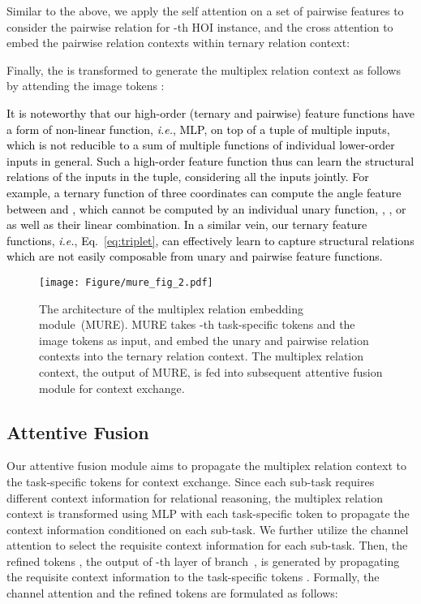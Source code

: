 \documentclass[10pt,twocolumn,letterpaper]{article}
\newcommand{\sh}[1]{\textcolor{black}{#1}}
\begin{document}
Similar to the above,
we apply the self attention on a set of pairwise features to consider the pairwise relation for -th HOI instance, and the cross attention to embed the pairwise relation contexts within ternary relation context:




Finally, the  is transformed to generate the multiplex relation context  as follows by attending the image tokens :


\sh{It is noteworthy that our high-order (ternary and pairwise) feature functions have a form of non-linear function, \textit{i.e.}, MLP, on top of a tuple of multiple inputs, which is not reducible to a sum of multiple functions of individual lower-order inputs in general. Such a high-order feature function thus can learn the structural relations of the inputs in the tuple, considering all the inputs jointly. For example, a ternary function of three coordinates  can compute the angle feature between {} and {}, which cannot be computed by an individual unary function, , , or  as well as their linear combination. In a similar vein, our ternary feature functions, \textit{i.e.}, Eq.~\ref{eq:triplet}, can effectively learn to capture structural relations which are not easily composable from unary and pairwise feature functions.
}


\begin{figure}[t!]
\centering
   \texttt{[image: Figure/mure\_fig\_2.pdf]}
   \caption{The architecture of the multiplex relation embedding module~(MURE). MURE takes -th task-specific tokens and the image tokens as input, and embed the unary and pairwise relation contexts into the ternary relation context. The multiplex relation context, the output of MURE, is fed into subsequent attentive fusion module for context exchange.}
\label{fig:mure_fig}
\vspace{-0.4cm}
\end{figure}


\subsection{Attentive Fusion}
Our attentive fusion module aims to propagate the multiplex relation context to the task-specific tokens for context exchange.
Since each sub-task requires different context information for relational reasoning, the multiplex relation context is transformed using MLP with each task-specific token to propagate the context information conditioned on each sub-task.
We further utilize the channel attention to select the requisite context information for each sub-task.
Then, the refined tokens , the output of -th layer of branch~, is generated by propagating the requisite context information to the task-specific tokens .
Formally, the channel attention  and the refined tokens  are formulated as follows:
\end{document}
